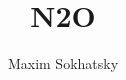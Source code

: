 
\renewcommand{\images}{http://synrc.com/framework/web/images}

\title{N2O}
\author{Maxim Sokhatsky}



